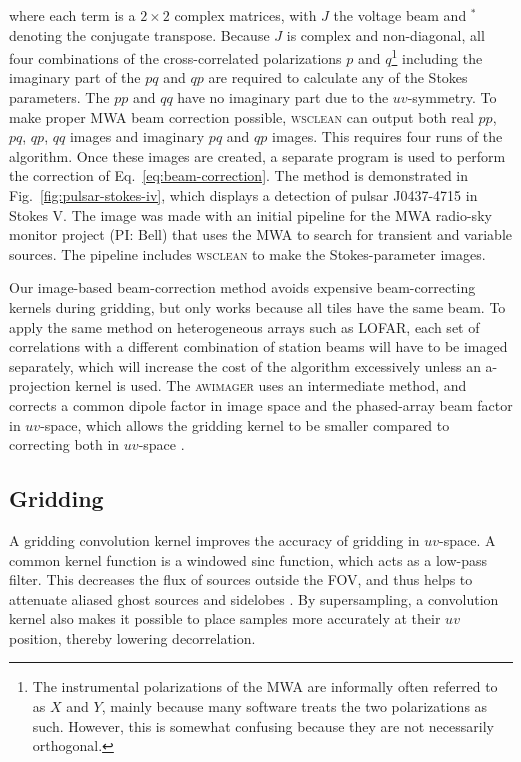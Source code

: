 \documentclass[useAMS,usenatbib]{mn2e}
\begin{document}
where each term is a $2\times2$ complex matrices, with $J$ the voltage beam and $^*$ denoting the conjugate transpose. Because $J$ is complex and non-diagonal, all four combinations of the cross-correlated polarizations $p$ and $q$\footnote{The instrumental polarizations of the MWA are informally often referred to as $X$ and $Y$, mainly because many software treats the two polarizations as such. However, this is somewhat confusing because they are not necessarily orthogonal.} including the imaginary part of the $pq$ and $qp$ are required to calculate any of the Stokes parameters. The $pp$ and $qq$ have no imaginary part due to the $uv$-symmetry. To make proper MWA beam correction possible, \textsc{wsclean} can output both real $pp$, $pq$, $qp$, $qq$ images and imaginary $pq$ and $qp$ images. This requires four runs of the algorithm. Once these images are created, a separate program is used to perform the correction of Eq.~\eqref{eq:beam-correction}. The method is demonstrated in Fig.~\ref{fig:pulsar-stokes-iv}, which displays a detection of pulsar J0437-4715 in Stokes V. The image was made with an initial pipeline for the MWA radio-sky monitor project (PI: Bell) that uses the MWA to search for transient and variable sources. The pipeline includes \textsc{wsclean} to make the Stokes-parameter images.

Our image-based beam-correction method avoids expensive beam-correcting kernels during gridding, but only works because all tiles have the same beam. To apply the same method on heterogeneous arrays such as LOFAR, each set of correlations with a different combination of station beams will have to be imaged separately, which will increase the cost of the algorithm excessively unless an a-projection kernel is used. The \textsc{awimager} uses an intermediate method, and corrects a common dipole factor in image space and the phased-array beam factor in $uv$-space, which allows the gridding kernel to be smaller compared to correcting both in $uv$-space \citep{awimager-2013}.

\subsection{Gridding} \label{sec:gridding}
A gridding convolution kernel improves the accuracy of gridding in $uv$-space. A common kernel function is a windowed sinc function, which acts as a low-pass filter. This decreases the flux of sources outside the FOV, and thus helps to attenuate aliased ghost sources and sidelobes \citep{post-correlation-filtering}. By supersampling, a convolution kernel also makes it possible to place samples more accurately at their $uv$ position, thereby lowering decorrelation.
\end{document}
